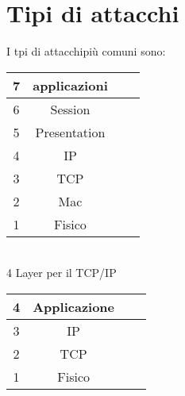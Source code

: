\chapter{Tipi di attacchi}	 %

I tpi di attacchipiù comuni sono:\\

\begin{tabular}{|c|c|c|c|}
	\hline 
	7& applicazioni &  &  \\ 
	\hline 
	6& Session &  &  \\ 
	\hline 
	5& Presentation &  &  \\ 
	\hline 
	4& IP  &  &  \\ 
	\hline 
	3& TCP &  &  \\ 
	\hline 
	2&  Mac&  &  \\ 
	\hline 
	1& Fisico &  &  \\ 
	\hline 
\end{tabular} \\

4 Layer per il TCP/IP \\

\begin{tabular}{|c|c|c|c|}
	\hline 
	4& Applicazione &  &  \\ 
	\hline 
	3& IP &  &  \\ 
	\hline 
	2&  TCP&  &  \\ 
	\hline 
	1& Fisico &  &  \\ 
	\hline 
\end{tabular} 